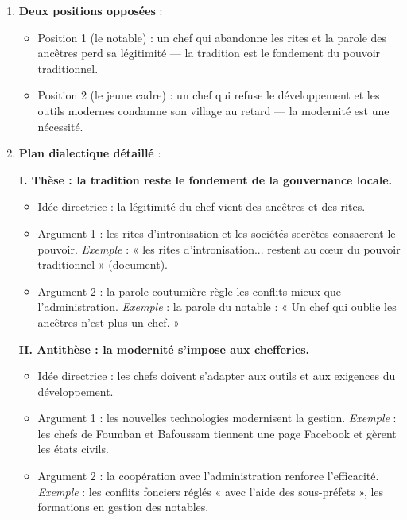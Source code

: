 \documentclass[11pt]{article}
\begin{document}
\begin{corrige}
\begin{enumerate}
\item \textbf{Deux positions opposées} :
\begin{itemize}
\item Position 1 (le notable) : un chef qui abandonne les rites et la parole des ancêtres perd sa légitimité — la tradition est le fondement du pouvoir traditionnel.
\item Position 2 (le jeune cadre) : un chef qui refuse le développement et les outils modernes condamne son village au retard — la modernité est une nécessité.
\end{itemize}

\item \textbf{Plan dialectique détaillé} :

\textbf{I. Thèse : la tradition reste le fondement de la gouvernance locale.}
\begin{itemize}
\item Idée directrice : la légitimité du chef vient des ancêtres et des rites.
\item Argument 1 : les rites d'intronisation et les sociétés secrètes consacrent le pouvoir. \emph{Exemple} : « les rites d'intronisation... restent au cœur du pouvoir traditionnel » (document).
\item Argument 2 : la parole coutumière règle les conflits mieux que l'administration. \emph{Exemple} : la parole du notable : « Un chef qui oublie les ancêtres n'est plus un chef. »
\end{itemize}

\textbf{II. Antithèse : la modernité s'impose aux chefferies.}
\begin{itemize}
\item Idée directrice : les chefs doivent s'adapter aux outils et aux exigences du développement.
\item Argument 1 : les nouvelles technologies modernisent la gestion. \emph{Exemple} : les chefs de Foumban et Bafoussam tiennent une page Facebook et gèrent les états civils.
\item Argument 2 : la coopération avec l'administration renforce l'efficacité. \emph{Exemple} : les conflits fonciers réglés « avec l'aide des sous-préfets », les formations en gestion des notables.
\end{itemize}


\end{enumerate}
\end{corrige}
\end{document}
